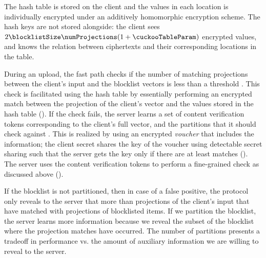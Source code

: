 The hash table is stored on the client and the values in each location is individually encrypted under an additively homomorphic encryption scheme. The hash keys are not stored alongside: the client sees $2 \blocklistSize \numProjections(1+\cuckooTableParam)$ encrypted values, and knows the relation between ciphertexts and their corresponding locations in the table. 

During an upload, the fast path checks if the number of matching projections between the client's input and the blocklist vectors is less than a threshold \detectionThreshold. This check is facilitated using the hash table by essentially performing an encrypted match between the projection of the client's vector and the values stored in the hash table ().
If the check fails, the server learns a set of content verification tokens corresponding to the client's full vector, and the partitions that it should check against . This is realized by using an encrypted \emph{voucher} that includes the information; the client secret shares the key of the voucher using detectable secret sharing such that the server gets the key only if there are at least \detectionThreshold matches (). The server uses the content verification tokens to perform a fine-grained check as discussed above (). 

\begin{remark}
If the blocklist is not partitioned, then in case of a false positive, the protocol only reveals to the server that more than \detectionThreshold projections of the client's input that have matched with projections of blocklisted items. If we partition the blocklist, the server learns more information because we reveal the subset of the blocklist where the projection matches have occurred. The number of partitions presents a tradeoff in performance vs. the amount of auxiliary information we are willing to reveal to the server. 

\end{remark}


